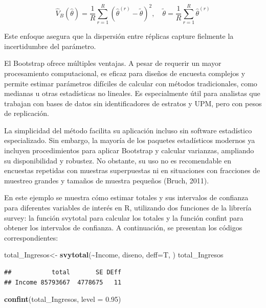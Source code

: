 \documentclass[
  12pt,
]{book}
\newenvironment{Shaded}{\begin{snugshade}}{\end{snugshade}}
\newcommand{\AttributeTok}[1]{\textcolor[rgb]{0.13,0.29,0.53}{#1}}
\newcommand{\FloatTok}[1]{\textcolor[rgb]{0.00,0.00,0.81}{#1}}
\newcommand{\FunctionTok}[1]{\textcolor[rgb]{0.13,0.29,0.53}{\textbf{#1}}}
\newcommand{\NormalTok}[1]{#1}
\newcommand{\OtherTok}[1]{\textcolor[rgb]{0.56,0.35,0.01}{#1}}
\newcommand{\SpecialCharTok}[1]{\textcolor[rgb]{0.81,0.36,0.00}{\textbf{#1}}}
\begin{document}
\[
\hat{V}_B(\hat{\theta}) = \frac{1}{R} \sum_{r=1}^{R} \left(\hat{\theta}^{(r)} - \tilde{\theta}\right)^2, \quad
\tilde{\theta} = \frac{1}{R} \sum_{r=1}^{R} \hat{\theta}^{(r)}
\]

Este enfoque asegura que la dispersión entre réplicas capture fielmente la incertidumbre del parámetro.

El Bootstrap ofrece múltiples ventajas. A pesar de requerir un mayor procesamiento computacional, es eficaz para diseños de encuesta complejos y permite estimar parámetros difíciles de calcular con métodos tradicionales, como medianas u otras estadísticas no lineales. Es especialmente útil para analistas que trabajan con bases de datos sin identificadores de estratos y UPM, pero con pesos de replicación.

La simplicidad del método facilita su aplicación incluso sin software estadístico especializado. Sin embargo, la mayoría de los paquetes estadísticos modernos ya incluyen procedimientos para aplicar Bootstrap y calcular varianzas, ampliando su disponibilidad y robustez. No obstante, su uso no es recomendable en encuestas repetidas con muestras superpuestas ni en situaciones con fracciones de muestreo grandes y tamaños de muestra pequeños (Bruch, 2011).

En este ejemplo se muestra cómo estimar totales y sus intervalos de confianza para diferentes variables de interés en R, utilizando dos funciones de la librería survey: la función svytotal para calcular los totales y la función confint para obtener los intervalos de confianza. A continuación, se presentan los códigos correspondientes:

\begin{Shaded}
\begin{Highlighting}[]
\NormalTok{total\_Ingresos}\OtherTok{\textless{}{-}} \FunctionTok{svytotal}\NormalTok{(}\SpecialCharTok{\textasciitilde{}}\NormalTok{Income, diseno, }\AttributeTok{deff=}\NormalTok{T, )}
\NormalTok{total\_Ingresos}
\end{Highlighting}
\end{Shaded}

\begin{verbatim}
##           total       SE DEff
## Income 85793667  4778675   11
\end{verbatim}

\begin{Shaded}
\begin{Highlighting}[]
\FunctionTok{confint}\NormalTok{(total\_Ingresos, }\AttributeTok{level =} \FloatTok{0.95}\NormalTok{)}
\end{Highlighting}
\end{Shaded}
\end{document}
